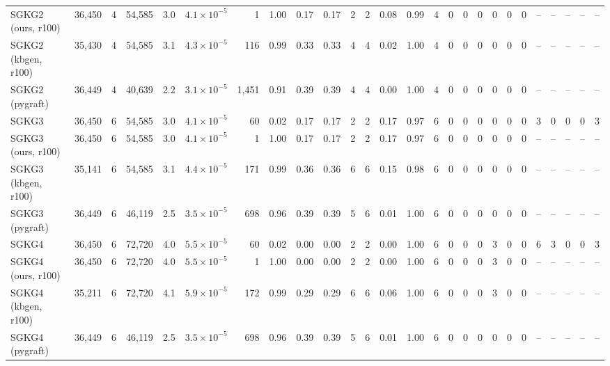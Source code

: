 \begin{tabular}{lrrrrrrrrrrrrrrrrrrrrrrrrr}
SGKG2 (ours, r100) & 36{,}450 & 4 & 54{,}585 & 3.0 & $4.1\times10^{-5}$ & 1 & 1.00 & 0.17 & 0.17 & 2 & 2 & 0.08 & 0.99 & 4 & 0 & 0 & 0 & 0 & 0 & 0 & – & – & – & – & – \\
SGKG2 (kbgen, r100) & 35{,}430 & 4 & 54{,}585 & 3.1 & $4.3\times10^{-5}$ & 116 & 0.99 & 0.33 & 0.33 & 4 & 4 & 0.02 & 1.00 & 4 & 0 & 0 & 0 & 0 & 0 & 0 & – & – & – & – & – \\
SGKG2 (pygraft) & 36{,}449 & 4 & 40{,}639 & 2.2 & $3.1\times10^{-5}$ & 1{,}451 & 0.91 & 0.39 & 0.39 & 4 & 4 & 0.00 & 1.00 & 4 & 0 & 0 & 0 & 0 & 0 & 0 & – & – & – & – & – \\
SGKG3 & 36{,}450 & 6 & 54{,}585 & 3.0 & $4.1\times10^{-5}$ & 60 & 0.02 & 0.17 & 0.17 & 2 & 2 & 0.17 & 0.97 & 6 & 0 & 0 & 0 & 0 & 0 & 0 & 3 & 0 & 0 & 0 & 3 \\
SGKG3 (ours, r100) & 36{,}450 & 6 & 54{,}585 & 3.0 & $4.1\times10^{-5}$ & 1 & 1.00 & 0.17 & 0.17 & 2 & 2 & 0.17 & 0.97 & 6 & 0 & 0 & 0 & 0 & 0 & 0 & – & – & – & – & – \\
SGKG3 (kbgen, r100) & 35{,}141 & 6 & 54{,}585 & 3.1 & $4.4\times10^{-5}$ & 171 & 0.99 & 0.36 & 0.36 & 6 & 6 & 0.15 & 0.98 & 6 & 0 & 0 & 0 & 0 & 0 & 0 & – & – & – & – & – \\
SGKG3 (pygraft) & 36{,}449 & 6 & 46{,}119 & 2.5 & $3.5\times10^{-5}$ & 698 & 0.96 & 0.39 & 0.39 & 5 & 6 & 0.01 & 1.00 & 6 & 0 & 0 & 0 & 0 & 0 & 0 & – & – & – & – & – \\
SGKG4 & 36{,}450 & 6 & 72{,}720 & 4.0 & $5.5\times10^{-5}$ & 60 & 0.02 & 0.00 & 0.00 & 2 & 2 & 0.00 & 1.00 & 6 & 0 & 0 & 0 & 3 & 0 & 0 & 6 & 3 & 0 & 0 & 3 \\
SGKG4 (ours, r100) & 36{,}450 & 6 & 72{,}720 & 4.0 & $5.5\times10^{-5}$ & 1 & 1.00 & 0.00 & 0.00 & 2 & 2 & 0.00 & 1.00 & 6 & 0 & 0 & 0 & 3 & 0 & 0 & – & – & – & – & – \\
SGKG4 (kbgen, r100) & 35{,}211 & 6 & 72{,}720 & 4.1 & $5.9\times10^{-5}$ & 172 & 0.99 & 0.29 & 0.29 & 6 & 6 & 0.06 & 1.00 & 6 & 0 & 0 & 0 & 3 & 0 & 0 & – & – & – & – & – \\
SGKG4 (pygraft) & 36{,}449 & 6 & 46{,}119 & 2.5 & $3.5\times10^{-5}$ & 698 & 0.96 & 0.39 & 0.39 & 5 & 6 & 0.01 & 1.00 & 6 & 0 & 0 & 0 & 0 & 0 & 0 & – & – & – & – & – \\
\bottomrule
\end{tabular}
